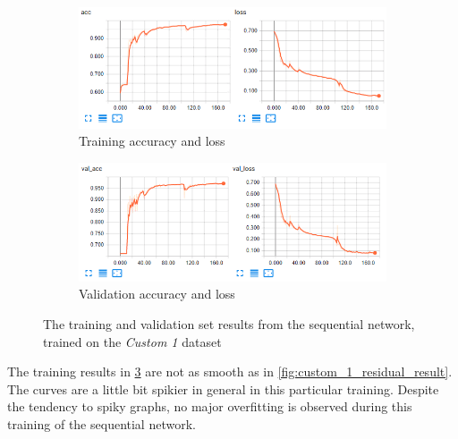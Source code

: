 \documentclass[USenglish]{ifimaster}  %
\begin{document}
\begin{figure}[ht]
\centering
\begin{subfigure}[b]{\textwidth}
\centering
\includegraphics[width=1\textwidth]{bilder/custom_1_training/Custom_1_sequential_acc_training_results.png}
\caption{Training accuracy and loss}
\label{fig:custom_1_sequential_acc_result}
\end{subfigure}
\hfill
\begin{subfigure}[b]{\textwidth}
\centering
\includegraphics[width=1\textwidth]{bilder/custom_1_training/Custom_1_sequential_val_acc_training_results.png}
\caption{Validation accuracy and loss}
\label{fig:custom_1_sequential_val_acc_result}
\end{subfigure}
\caption{The training and validation set results from the sequential network, trained on the \textit{Custom 1} dataset}
\label{fig:custom_1_sequential_result}
\end{figure}

The training results in \cref{fig:custom_1_sequential_result} are not as smooth as in \cref{fig:custom_1_residual_result}. The curves are a little bit spikier in general in this particular training. Despite the tendency to spiky graphs, no major overfitting is observed during this training of the sequential network.
\end{document}
